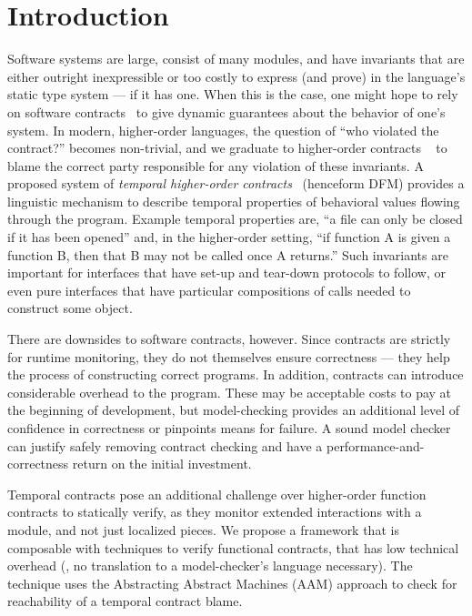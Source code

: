 \section{Introduction}

Software systems are large, consist of many modules, and have invariants that are either outright inexpressible or too costly to express (and prove) in the language's static type system --- if it has one.
%
When this is the case, one might hope to rely on software contracts~\cite{dvanhorn:dvanhorn:meyer-eiffel} to give dynamic guarantees about the behavior of one's system.
%
In modern, higher-order languages, the question of ``who violated the contract?'' becomes non-trivial, and we graduate to higher-order contracts ~\citep{dvanhorn:Findler2002Contracts} to blame the correct party responsible for any violation of these invariants.
%
A proposed system of \emph{temporal higher-order contracts}~\citep{ianjohnson:dfm:icfp2011} (henceform DFM) provides a linguistic mechanism to describe temporal properties of behavioral values flowing through the program.
%
%
Example temporal properties are, ``a file can only be closed if it has been opened'' and, in the higher-order setting, ``if function A is given a function B, then that B may not be called once A returns.''
%
Such invariants are important for interfaces that have set-up and tear-down protocols to follow, or even pure interfaces that have particular compositions of calls needed to construct some object.

There are downsides to software contracts, however.
%
Since contracts are strictly for runtime monitoring, they do not themselves ensure correctness --- they help the process of constructing correct programs.
%
In addition, contracts can introduce considerable overhead to the program.
%
These may be acceptable costs to pay at the beginning of development, but model-checking provides an additional level of confidence in correctness or pinpoints means for failure.
%
A sound model checker can justify safely removing contract checking and have a performance-and-correctness return on the initial investment.

Temporal contracts pose an additional challenge over higher-order function contracts to statically verify, as they monitor extended interactions with a module, and not just localized pieces.
%
We propose a framework that is composable with techniques to verify functional contracts, that has low technical overhead (\eg, no translation to a model-checker's language necessary).
%
The technique uses the Abstracting Abstract Machines (AAM) approach \citep{dvanhorn:VanHorn2010Abstracting} to check for reachability of a temporal contract blame.

